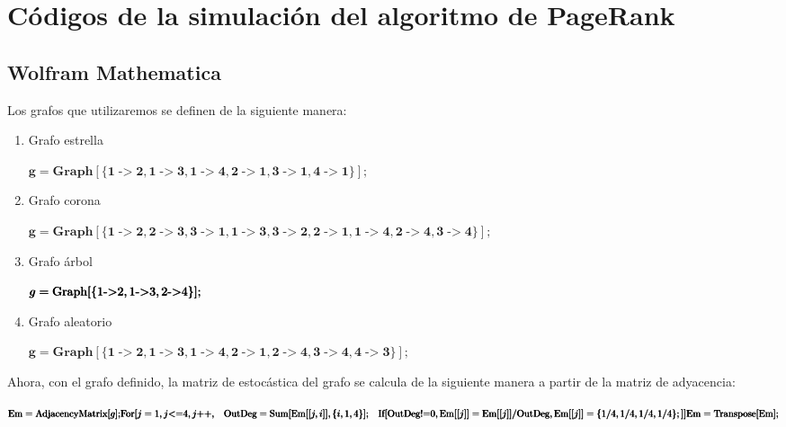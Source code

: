 \chapter{Códigos de la simulación del algoritmo de PageRank}
\label{ch:pagerankcod}

\section{Wolfram Mathematica}

Los grafos que utilizaremos se definen de la siguiente manera:

\begin{enumerate}
    \item Grafo estrella

\begin{doublespace}
\noindent\(\pmb{g=\text{Graph}[\{1\text{-$>$}2,1\text{-$>$}3,1\text{-$>$}4,2\text{-$>$}1,3\text{-$>$}1,4\text{-$>$}1\}];}
\)
\end{doublespace}

    \item Grafo corona

\begin{doublespace}
\noindent\(\pmb{g=\text{Graph}[\{1\text{-$>$}2,2\text{-$>$}3,3\text{-$>$}1, 1\text{-$>$}3,3\text{-$>$}2,2\text{-$>$}1, 1\text{-$>$}4,2\text{-$>$}4,3\text{-$>$}4\}];}
\)
\end{doublespace}

    \item Grafo árbol

\begin{doublespace}
\noindent\(\pmb{g=\text{Graph}[\{1\text{-$>$}2,1\text{-$>$}3,2\text{-$>$}4\}];}\\
\)
\end{doublespace}

    \item Grafo aleatorio

\begin{doublespace}
\noindent\(\pmb{g=\text{Graph}[\{1\text{-$>$}2,1\text{-$>$}3,1\text{-$>$}4,2\text{-$>$}1,2\text{-$>$}4,3\text{-$>$}4,4\text{-$>$}3\}];}
\)
\end{doublespace}
\end{enumerate}

Ahora, con el grafo definido, la matriz de estocástica del grafo se calcula de la siguiente manera a partir de la matriz de adyacencia:

\begin{doublespace}
\noindent\(\pmb{\text{Em}=\text{AdjacencyMatrix}[g]; }\\
\pmb{\text{For}[j=1,j\text{$<$=}4,j\text{++},}\\
\pmb{\quad \text{OutDeg}=\text{Sum}[\text{Em}[[j,i]],\{i,1,4\}];}\\
\pmb{\quad \text{If}[\text{OutDeg}\text{!=}0, \text{Em}[[j]]=\text{Em}[[j]]/\text{OutDeg}, \text{Em}[[j]]=\{1/4,1/4,1/4,1/4\};]]}\\
\pmb{\text{Em}=\text{Transpose}[\text{Em}]; }\\
\)
\end{doublespace}

